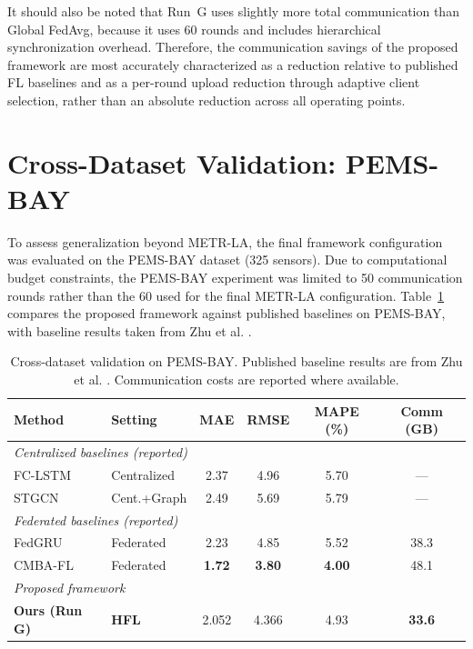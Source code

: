 It should also be noted that Run~G uses slightly more total communication than Global FedAvg, because it uses 60 rounds and includes hierarchical synchronization overhead. Therefore, the communication savings of the proposed framework are most accurately characterized as a reduction relative to published FL baselines and as a per-round upload reduction through adaptive client selection, rather than an absolute reduction across all operating points.

\section{Cross-Dataset Validation: PEMS-BAY}
\label{sec:pemsbay_results}

To assess generalization beyond METR-LA, the final framework configuration was evaluated on the PEMS-BAY dataset (325 sensors). Due to computational budget constraints, the PEMS-BAY experiment was limited to 50 communication rounds rather than the 60 used for the final METR-LA configuration. Table~\ref{tab:pemsbay_results} compares the proposed framework against published baselines on PEMS-BAY, with baseline results taken from Zhu et al. \cite{zhu2025cmba}.

\begin{table}[H]
\centering
\caption{Cross-dataset validation on PEMS-BAY. Published baseline results are from Zhu et al. \cite{zhu2025cmba}. Communication costs are reported where available.}
\label{tab:pemsbay_results}
\small
\setlength{\tabcolsep}{4pt}
\renewcommand{\arraystretch}{1.15}
\begin{tabular}{l l c c c c}
\hline
\textbf{Method} & \textbf{Setting} & \textbf{MAE} & \textbf{RMSE} & \textbf{MAPE (\%)} & \textbf{Comm (GB)} \\
\hline
\multicolumn{6}{l}{\textit{Centralized baselines (reported)}} \\
\hline
FC-LSTM \cite{hochreiter1997} & Centralized & 2.37 & 4.96 & 5.70 & --- \\
STGCN \cite{yu2018stgcn} & Cent.+Graph & 2.49 & 5.69 & 5.79 & --- \\
\hline
\multicolumn{6}{l}{\textit{Federated baselines (reported)}} \\
\hline
FedGRU \cite{liu2020fedgru} & Federated & 2.23 & 4.85 & 5.52 & 38.3 \\
CMBA-FL \cite{zhu2025cmba} & Federated & \textbf{1.72} & \textbf{3.80} & \textbf{4.00} & 48.1 \\
\hline
\multicolumn{6}{l}{\textit{Proposed framework}} \\
\hline
\textbf{Ours (Run G)} & \textbf{HFL} & 2.052 & 4.366 & 4.93 & \textbf{33.6} \\
\hline
\end{tabular}
\end{table}

